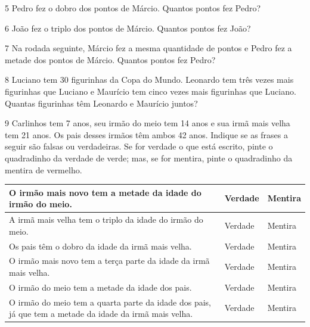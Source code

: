 \begin{escolha}
\begin{escolha}
\num{5} Pedro fez o dobro dos pontos de Márcio. Quantos pontos fez Pedro?


\num{6} João fez o triplo dos pontos de Márcio. Quantos pontos fez João?


\num{7} Na rodada seguinte, Márcio fez a mesma quantidade de pontos e Pedro
  fez a metade dos pontos de Márcio. Quantos pontos fez Pedro?


\num{8} Luciano tem 30 figurinhas da Copa do Mundo. Leonardo tem três
vezes mais figurinhas que Luciano e Maurício tem cinco vezes mais figurinhas que Luciano.
Quantas figurinhas têm Leonardo e Maurício juntos?




\redulina{\mbox{}\hfill}

\num{9} Carlinhos tem 7 anos, seu irmão do meio tem 14 anos e sua irmã mais
velha tem 21 anos. Os pais desses irmãos têm ambos 42 anos. Indique se
as frases a seguir são falsas ou verdadeiras. Se for verdade o que está
escrito, pinte o quadradinho da verdade de verde; mas, se for mentira,
pinte o quadradinho da mentira de vermelho.

\begin{longtable}[]{@{}lll@{}}
\toprule
O irmão mais novo tem a metade da idade do irmão do meio. & Verdade &
Mentira\tabularnewline
\midrule
\endhead
A irmã mais velha tem o triplo da idade do irmão do meio. & Verdade &
Mentira\tabularnewline
Os pais têm o dobro da idade da irmã mais velha. & Verdade &
Mentira\tabularnewline
O irmão mais novo tem a terça parte da idade da irmã mais velha. &
Verdade & Mentira\tabularnewline
O irmão do meio tem a metade da idade dos pais. & Verdade &
Mentira\tabularnewline
O irmão do meio tem a quarta parte da idade dos pais, já que tem a
metade da idade da irmã mais velha. & Verdade & Mentira\tabularnewline
\bottomrule
\end{longtable}



\end{escolha}
\end{escolha}
